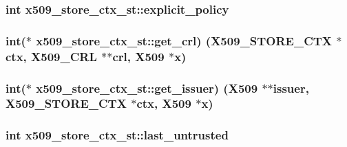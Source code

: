 \subsubsection[{\texorpdfstring{explicit\+\_\+policy}{explicit_policy}}]{\setlength{\rightskip}{0pt plus 5cm}int x509\+\_\+store\+\_\+ctx\+\_\+st\+::explicit\+\_\+policy}\hypertarget{structx509__store__ctx__st_a428d424dc177abfdaa06d44a8951e495}{}\label{structx509__store__ctx__st_a428d424dc177abfdaa06d44a8951e495}
\subsubsection[{\texorpdfstring{get\+\_\+crl}{get_crl}}]{\setlength{\rightskip}{0pt plus 5cm}int($\ast$ x509\+\_\+store\+\_\+ctx\+\_\+st\+::get\+\_\+crl) ({\bf X509\+\_\+\+S\+T\+O\+R\+E\+\_\+\+C\+TX} $\ast${\bf ctx}, {\bf X509\+\_\+\+C\+RL} $\ast$$\ast$crl, {\bf X509} $\ast$x)}\hypertarget{structx509__store__ctx__st_a9b8772fbdd21b22482593ee27db9d12d}{}\label{structx509__store__ctx__st_a9b8772fbdd21b22482593ee27db9d12d}
\subsubsection[{\texorpdfstring{get\+\_\+issuer}{get_issuer}}]{\setlength{\rightskip}{0pt plus 5cm}int($\ast$ x509\+\_\+store\+\_\+ctx\+\_\+st\+::get\+\_\+issuer) ({\bf X509} $\ast$$\ast$issuer, {\bf X509\+\_\+\+S\+T\+O\+R\+E\+\_\+\+C\+TX} $\ast${\bf ctx}, {\bf X509} $\ast$x)}\hypertarget{structx509__store__ctx__st_a5374f462a245a61de3aa7a7ccf18ddb9}{}\label{structx509__store__ctx__st_a5374f462a245a61de3aa7a7ccf18ddb9}
\subsubsection[{\texorpdfstring{last\+\_\+untrusted}{last_untrusted}}]{\setlength{\rightskip}{0pt plus 5cm}int x509\+\_\+store\+\_\+ctx\+\_\+st\+::last\+\_\+untrusted}\hypertarget{structx509__store__ctx__st_ab269810ffeac1c116f7fabe0ba50690f}{}\label{structx509__store__ctx__st_ab269810ffeac1c116f7fabe0ba50690f}
